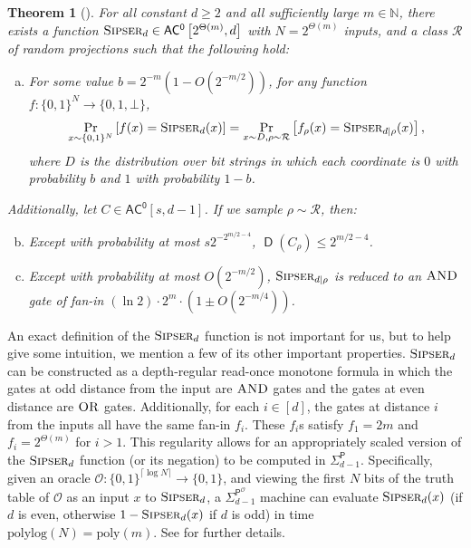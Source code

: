 \documentclass[10pt,a4paper]{article}
\newtheorem{theorem}{Theorem}
\newcommand{\Naturals}{\mathbb{N}}
\newcommand{\poly}{\mathrm{poly}}
\newcommand{\polylog}{\mathrm{polylog}}
\newcommand{\Sipser}{\normalfont\textsc{Sipser}}
\newcommand{\AND}{\normalfont\textsc{AND}} %
\newcommand{\OR}{\normalfont\textsc{OR}}
\DeclareMathOperator{\D}{\mathsf{D}}
\begin{document}
\begin{theorem}[{\cite[Proof of Theorem 10.1]{HRST17}}]
\label{thm:hrst}
For all constant $d \ge 2$ and all sufficiently large $m \in \Naturals$, there exists a function $\Sipser_d \in \mathsf{AC^0}\left[2^{\Theta(m)}, d\right]$ with $N = 2^{\Theta(m)}$ inputs, and a class $\mathcal{R}$ of random projections such that the following hold:
\begin{enumerate}[(a)]
\item For some value $b = 2^{-m}\left(1 - O\left(2^{-m/2}\right)\right)$, for any function $f: \{0,1\}^N \to \{0,1,\bot\}$,
\[
\Pr_{x \sim \{0,1\}^N}\left[f(x) = \Sipser_d(x)\right] = \Pr_{x \sim D, \rho \sim \mathcal{R}}\left[f_\rho(x) = \Sipser_{d|\rho} (x)\right],
\]
where $D$ is the distribution over bit strings in which each coordinate is $0$ with probability $b$ and $1$ with probability $1 - b$.
\end{enumerate}
Additionally, let $C \in \mathsf{AC^0}[s, d - 1]$. If we sample $\rho \sim \mathcal{R}$, then:
\begin{enumerate}[(a)]
\setcounter{enumi}{1}
\item Except with probability at most $s2^{-2^{m/2 - 4}}$, $\D\left(C_\rho\right) \le 2^{m/2 - 4}$.
\item Except with probability at most $O\left(2^{-m/2}\right)$, $\Sipser_{d|\rho}$ is reduced to an $\AND$ gate of fan-in $(\ln 2) \cdot 2^m \cdot \left(1 \pm O\left(2^{-m/4}\right)\right)$.
\end{enumerate}
\end{theorem}

An exact definition of the $\Sipser_d$ function is not important for us, but to help give some intuition, we mention a few of its other important properties. $\Sipser_d$ can be constructed as a depth-regular read-once monotone formula in which the gates at odd distance from the input are $\AND$ gates and the gates at even distance are $\OR$ gates. Additionally, for each $i \in [d]$, the gates at distance $i$ from the inputs all have the same fan-in $f_i$. These $f_i$s satisfy $f_1 = 2m$ and $f_i = 2^{\Theta(m)}$ for $i > 1$. This regularity allows for an appropriately scaled version of the $\Sipser_d$ function (or its negation) to be computed in $\mathsf{\Sigma}_{d-1}^\mathsf{P}$. Specifically, given an oracle $\mathcal{O}: \{0,1\}^{\lceil \log N \rceil} \to \{0,1\}$, and viewing the first $N$ bits of the truth table of $\mathcal{O}$ as an input $x$ to $\Sipser_d$, a  $\mathsf{\Sigma}_{d-1}^{\mathsf{P}^\mathcal{O}}$ machine can evaluate $\Sipser_d(x)$ (if $d$ is even, otherwise $1 - \Sipser_d(x)$ if $d$ is odd) in time $\polylog(N) = \poly(m)$. See \cite{RST15,HRST17} for further details.
\end{document}

